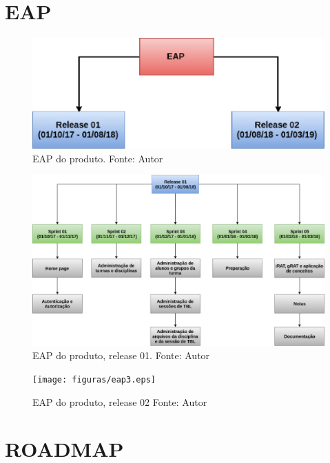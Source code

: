 \begin{apendicesenv}

\partapendices

\chapter{EAP} \label{apendice:eap}

\begin{figure}[h!]
	\centering
  \includegraphics[keepaspectratio=true,scale=0.8]{figuras/eap1.eps}
  \caption[EAP do produto.]{EAP do produto. Fonte: Autor}
	\label{fig:eap}
\end{figure}

\begin{figure}[h!]
	\centering
  \includegraphics[keepaspectratio=true,scale=0.4]{figuras/eap2.eps}
  \caption[EAP do produto, release 01]{EAP do produto, release 01. Fonte: Autor}
	\label{fig:eap}
\end{figure}

\begin{figure}[h!]
	\centering
  \texttt{[image: figuras/eap3.eps]}
  \caption[EAP do produto, release 02.]{EAP do produto, release 02 Fonte: Autor}
	\label{fig:eap}
\end{figure}

\chapter{ROADMAP} \label{apendice:roadmap}


\end{apendicesenv}

